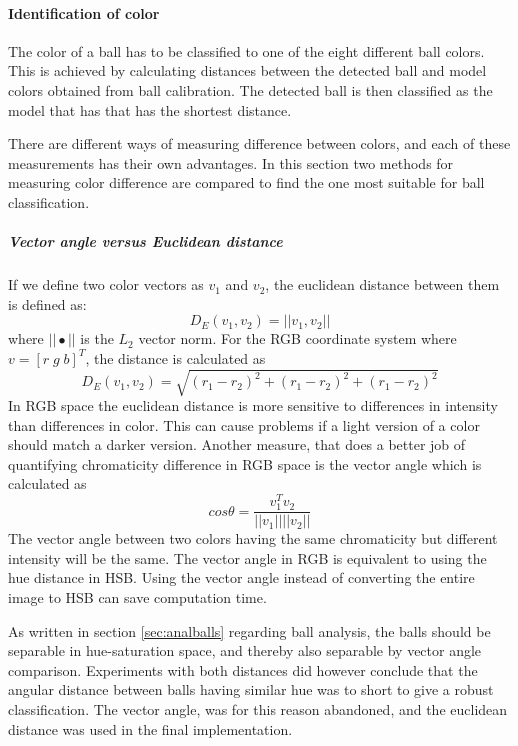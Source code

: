 \paragraph{Identification of color}
The color of a ball has to be classified to one of the eight different ball colors. This is achieved by calculating distances between the detected ball and model colors obtained from ball calibration. The detected ball is then classified as the model that has that has the shortest distance.

There are different ways of measuring difference between colors, and each of these measurements has their own advantages. In this section two methods for measuring color difference are compared to find the one most suitable for ball classification.
\subparagraph{Vector angle versus Euclidean distance}
If we define two color vectors as $v_{1}$ and $v_{2}$, the euclidean distance between them is defined as:
\begin{equation}
D_{E}(v_{1}, v_{2}) = ||v_{1}, v_{2}||
\end{equation}
where $||\bullet||$ is the $L_{2}$ vector norm. For the RGB coordinate system where $v = [r\;g\;b]^{T}$, the distance is calculated as
\begin{equation}
D_{E}(v_{1}, v_{2}) = \sqrt{(r_{1} - r_{2})^{2} + (r_{1} - r_{2})^{2} + (r_{1} - r_{2})^{2}}
\end{equation}
In RGB space the euclidean distance is more sensitive to differences in intensity than differences in color. This can cause problems if a light version of a color should match a darker version. Another measure, that does a better job of quantifying chromaticity difference in RGB space is the vector angle which is calculated as
\begin{equation}
cos \theta = \frac{v_{1}^ Tv_{2}}{||v_{1}|| ||v_{2}||}
\end{equation}
The vector angle between two colors having the same chromaticity but different intensity will be the same.  The vector angle in RGB is equivalent to using the hue distance in HSB. Using the vector angle instead of converting the entire image to HSB can save computation time.\cite{angleVsEuclidean}

As written in section \ref{sec:analballs} regarding ball analysis, the balls should be separable in hue-saturation space, and thereby also separable by vector angle comparison. Experiments with both distances did however conclude that the angular distance between balls having similar hue was to short to give a robust classification. The vector angle, was for this reason abandoned, and the euclidean distance was used in the final implementation.

